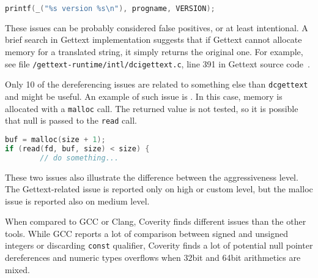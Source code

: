 \begin{lstlisting}[frame=none, basicstyle=\footnotesize\ttfamily,
language=C, numbers=none, numberstyle=\tiny\color{black},caption=
{{\tt xfs\_mkfs.c:1713}: Line which is reportedly dereferencing a potentially
null pointer with Gettext},
label={lst:results:dereferencePrintf}]
printf(_("%s version %s\n"), progname, VERSION);
\end{lstlisting}

These issues can be probably considered false positives, or at least
intentional. A brief search in Gettext implementation suggests that if Gettext
cannot allocate memory for a translated string, it simply returns the original
one. For example, see file {\tt /gettext-runtime/intl/dcigettext.c}, line 391
in Gettext source code~\cite{GettextGit}.

Only 10 of the dereferencing issues are related to something else
than {\tt dcgettext} and might be useful. An example of such issue is
.  In this case, memory is allocated with a
{\tt malloc} call. The returned value is not tested, so it is possible that
null is passed to the {\tt read} call.

\begin{lstlisting}[frame=none, basicstyle=\footnotesize\ttfamily,
language=C, numbers=none, numberstyle=\tiny\color{black},caption=
{{\tt proto.c:66}: Line which is reportedly dereferencing a potentially null
pointer - no malloc check.},
label={lst:results:dereferenceBuf}]
buf = malloc(size + 1);
if (read(fd, buf, size) < size) {
        // do something...
\end{lstlisting}

These two issues also illustrate the difference between the aggressiveness
level. The Gettext-related issue is reported only on high or custom level, but
the malloc issue is reported also on medium level.

When compared to GCC or Clang, Coverity finds different issues than the other
tools. While GCC reports a lot of comparison between signed and unsigned
integers or discarding {\tt const} qualifier, Coverity finds a lot of potential
null pointer dereferences and numeric types overflows when 32bit and 64bit
arithmetics are mixed.


